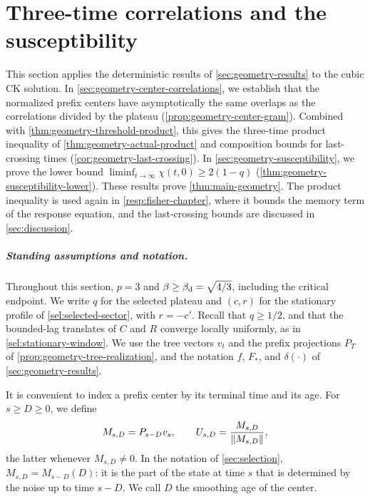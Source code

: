 \chapter{Three-time correlations and the susceptibility}\label{sec:three-time}

This section applies the deterministic results of \cref{sec:geometry-results} to the cubic CK solution. In \cref{sec:geometry-center-correlations}, we establish that the normalized prefix centers have asymptotically the same overlaps as the correlations divided by the plateau (\cref{prop:geometry-center-gram}). Combined with \cref{thm:geometry-threshold-product}, this gives the three-time product inequality of \cref{thm:geometry-actual-product} and composition bounds for last-crossing times (\cref{cor:geometry-last-crossing}). In \cref{sec:geometry-susceptibility}, we prove the lower bound $\liminf_{t\to\infty}\chi(t,0)\ge2(1-q)$ (\cref{thm:geometry-susceptibility-lower}). These results prove \cref{thm:main-geometry}. The product inequality is used again in \cref{resp:fisher-chapter}, where it bounds the memory term of the response equation, and the last-crossing bounds are discussed in \cref{sec:discussion}.

\paragraph{Standing assumptions and notation.}
Throughout this section, $p=3$ and $\beta\ge\beta_{\mathrm d}=\sqrt{4/3}$, including the critical endpoint. We write $q$ for the selected plateau and $(c,r)$ for the stationary profile of \cref{sel:selected-sector}, with $r=-c'$. Recall that $q\ge1/2$, and that the bounded-lag translates of $C$ and $R$ converge locally uniformly, as in \eqref{sel:stationary-window}. We use the tree vectors $v_t$ and the prefix projections $P_T$ of \cref{prop:geometry-tree-realization}, and the notation $f$, $F_*$, and $\delta(\cdot)$ of \cref{sec:geometry-results}.

It is convenient to index a prefix center by its terminal time and its age. For $s\ge D\ge0$, we define
\[
 M_{s,D}=P_{s-D}v_s,\qquad U_{s,D}=\frac{M_{s,D}}{\lVert M_{s,D}\rVert},
\]
the latter whenever $M_{s,D}\ne0$. In the notation of \cref{sec:selection}, $M_{s,D}=M_{s-D}(D)$: it is the part of the state at time $s$ that is determined by the noise up to time $s-D$. We call $D$ the smoothing age of the center.

